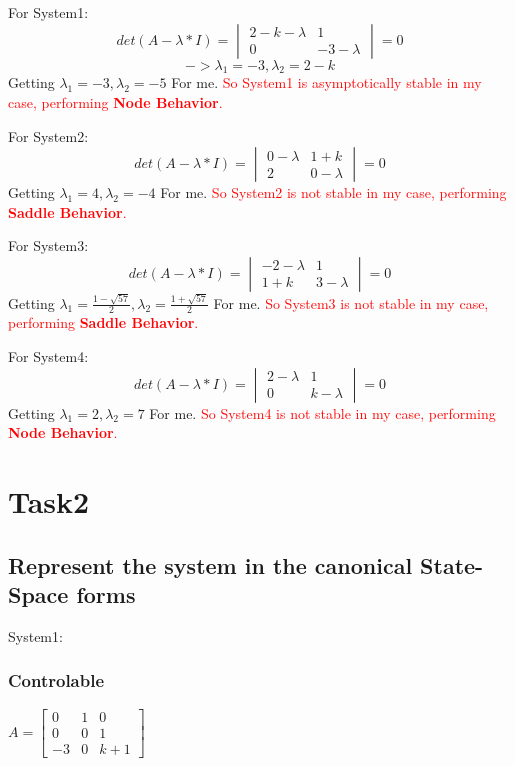 \documentclass[12pt,a4paper,oneside]{ctexart}
\begin{document}
    For System1:
    $$det(A-\lambda*I) =\begin{vmatrix}
       2-k-\lambda & 1 \\
       0 & -3-\lambda 
    \end{vmatrix} = 0$$
    $$ ->\lambda_1 = -3, \lambda_2 = 2-k $$
    Getting $\lambda_1 = -3, \lambda_2 = -5$ For me.
    \textcolor{red}{So System1 is asymptotically stable in my case, performing \textbf{Node Behavior}.}

    For System2:
    $$det(A-\lambda*I) =\begin{vmatrix}
        0-\lambda & 1+k \\
        2 & 0-\lambda 
     \end{vmatrix} = 0$$
    Getting $\lambda_1 = 4, \lambda_2 = -4$ For me.
    \textcolor{red}{So System2 is not stable in my case, performing \textbf{Saddle Behavior}.}

    For System3:
    $$det(A-\lambda*I) =\begin{vmatrix}
       -2-\lambda & 1 \\
        1+k & 3-\lambda 
     \end{vmatrix} = 0$$
    Getting $\lambda_1 = \frac{1-\sqrt{57}}{2}, \lambda_2 = \frac{1+\sqrt{57}}{2}$ For me.
    \textcolor{red}{So System3 is not stable in my case, performing \textbf{Saddle Behavior}.}

    For System4:
    $$det(A-\lambda*I) =\begin{vmatrix}
        2-\lambda & 1 \\
        0 & k-\lambda 
      \end{vmatrix} = 0$$
    Getting $\lambda_1 = 2, \lambda_2 = 7$ For me.
    \textcolor{red}{So System4 is not stable in my case, performing \textbf{Node Behavior}.}

    \section{Task2}
    \subsection{Represent the system in the canonical State-Space forms}
    System1:
    \subsubsection*{Controlable}
    $A = \begin{bmatrix}
        0&1&0\\
        0&0&1\\
        -3&0&k+1
    \end{bmatrix}$
\end{document}
